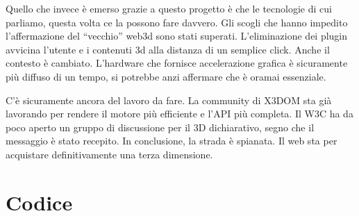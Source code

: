 \documentclass[a4paper,12pt]{report}
\begin{document}
Quello che invece è emerso grazie a questo progetto è che le tecnologie di cui parliamo, questa volta ce la possono fare davvero. Gli scogli che hanno impedito l'affermazione del ``vecchio'' web3d sono stati superati. L'eliminazione dei plugin avvicina l'utente e i contenuti 3d alla distanza di un semplice click. Anche il contesto è cambiato. L'hardware che fornisce accelerazione grafica è sicuramente più diffuso di un tempo, si potrebbe anzi affermare che è oramai essenziale.

C'è sicuramente ancora del lavoro da fare. La community di X3DOM sta già lavorando per rendere il motore più efficiente e l'API più completa. Il W3C ha da poco aperto un gruppo di discussione per il 3D dichiarativo, segno che il messaggio è stato recepito. In conclusione, la strada è spianata. Il web sta per acquistare definitivamente una terza dimensione.
\newpage
{}
\begin{thebibliography}{99}


\end{thebibliography}
\appendix
\linespread{1}
\chapter{Codice}

\def\baselinestretch{0.7}
\def\baselinestretch{1}
\end{document}
